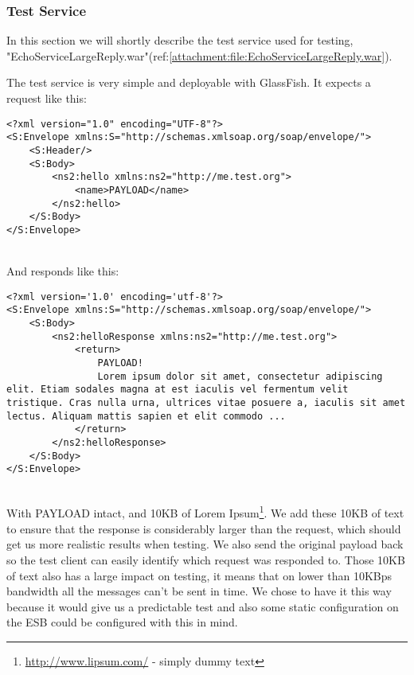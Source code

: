 \subsubsection{Test Service}\label{Testing:About:Service}
    In this section we will shortly describe the test service used for testing, "EchoServiceLargeReply.war"(ref:\ref{attachment:file:EchoServiceLargeReply.war}).

    The test service is very simple and deployable with GlassFish. It expects a request like this:
    \lstset{language=XML, style=eclipse}
    \begin{lstlisting}
<?xml version="1.0" encoding="UTF-8"?>
<S:Envelope xmlns:S="http://schemas.xmlsoap.org/soap/envelope/">
    <S:Header/>
    <S:Body>
        <ns2:hello xmlns:ns2="http://me.test.org">
            <name>PAYLOAD</name>
        </ns2:hello>
    </S:Body>
</S:Envelope>
    \end{lstlisting}
    \\
    And responds like this:
    \begin{lstlisting}
<?xml version='1.0' encoding='utf-8'?>
<S:Envelope xmlns:S="http://schemas.xmlsoap.org/soap/envelope/">
    <S:Body>
        <ns2:helloResponse xmlns:ns2="http://me.test.org">
            <return>
                PAYLOAD!
                Lorem ipsum dolor sit amet, consectetur adipiscing elit. Etiam sodales magna at est iaculis vel fermentum velit tristique. Cras nulla urna, ultrices vitae posuere a, iaculis sit amet lectus. Aliquam mattis sapien et elit commodo ...
            </return>
        </ns2:helloResponse>
    </S:Body>
</S:Envelope>
    \end{lstlisting}
    \\
    With PAYLOAD intact, and 10KB of Lorem Ipsum\footnote{\url{http://www.lipsum.com/} - simply dummy text}. We add these 10KB of text to ensure that the response is considerably larger than the request, which should get us more realistic results when testing. We also send the original payload back so the test client can easily identify which request was responded to. Those 10KB of text also has a large impact on testing, it means that on lower than 10KBps bandwidth all the messages can't be sent in time. We chose to have it this way because it would give us a predictable test and also some static configuration on the ESB could be configured with this in mind.

